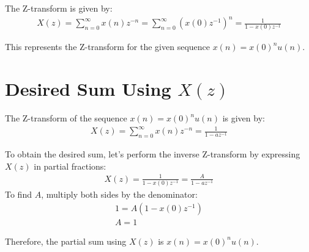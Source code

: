\documentclass{article}
\begin{document}
The Z-transform is given by:
\begin{align}
X(z) = \sum_{n=0}^{\infty} x(n)z^{-n} = \sum_{n=0}^{\infty} (x(0)z^{-1})^n = \frac{1}{1 - x(0)z^{-1}} 
\end{align}

This represents the Z-transform for the given sequence \( x(n) = x(0)^n u(n) \).

\section*{Desired Sum Using $X(z)$}
The Z-transform of the sequence \( x(n) = x(0)^n u(n) \) is given by:
\begin{align}
X(z) = \sum_{n=0}^{\infty} x(n)z^{-n} = \frac{1}{1 - az^{-1}} 
\end{align}

To obtain the desired sum, let's perform the inverse Z-transform by expressing \( X(z) \) in partial fractions:
\begin{align}
X(z) = \frac{1}{1 - x(0)z^{-1}} = \frac{A}{1 - az^{-1}} 
\end{align}
To find \(A\), multiply both sides by the denominator:
\begin{align}
1 = A(1 - x(0)z^{-1}) \\
A=1
\end{align}

Therefore, the partial sum using \(X(z)\) is \(x(n) = x(0)^n u(n)\).
\end{document}
